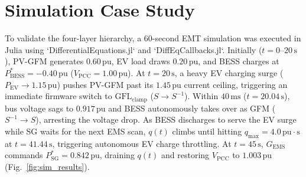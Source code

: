 \documentclass[journal]{IEEEtran}
\begin{document}
\section{Simulation Case Study}
To validate the four-layer hierarchy, a 60-second EMT simulation was executed in Julia using `DifferentialEquations.jl` and `DiffEqCallbacks.jl`. Initially ($t = 0\text{--}20\,\mathrm{s}$), PV-GFM generates $0.60\,\mathrm{pu}$, EV load draws $0.20\,\mathrm{pu}$, and BESS charges at $P_{\mathrm{BESS}}^* = -0.40\,\mathrm{pu}$ ($V_{\mathrm{PCC}} = 1.00\,\mathrm{pu}$). At $t = 20\,\mathrm{s}$, a heavy EV charging surge ($P_{\mathrm{EV}} \to 1.15\,\mathrm{pu}$) pushes PV-GFM past its $1.45\,\mathrm{pu}$ current ceiling, triggering an immediate firmware switch to $\mathrm{GFL}_{\mathrm{clamp}}$ ($S \to S^{-1}$). Within $40\,\mathrm{ms}$ ($t = 20.04\,\mathrm{s}$), bus voltage sags to $0.917\,\mathrm{pu}$ and BESS autonomously takes over as GFM ($S^{-1} \to S$), arresting the voltage drop. As BESS discharges to serve the EV surge while SG waits for the next EMS scan, $q(t)$ climbs until hitting $q_{\max} = 4.0\,\mathrm{pu\cdot s}$ at $t = 41.44\,\mathrm{s}$, triggering autonomous EV charge throttling. At $t = 45\,\mathrm{s}$, $G_{\mathrm{EMS}}$ commands $P_{\mathrm{SG}}^* = 0.842\,\mathrm{pu}$, draining $q(t)$ and restoring $V_{\mathrm{PCC}}$ to $1.003\,\mathrm{pu}$ (Fig.~\ref{fig:sim_results}).
\end{document}
